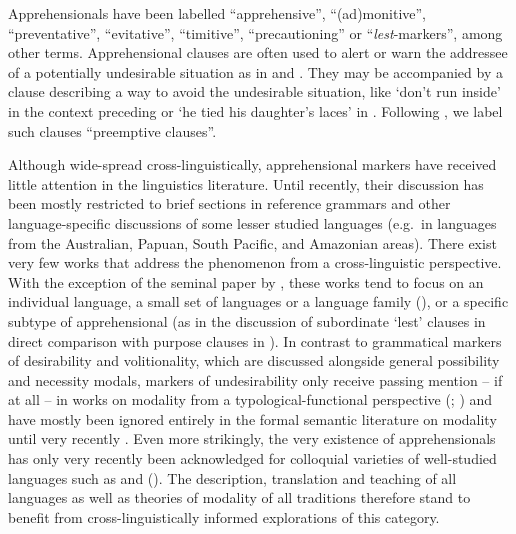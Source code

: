\documentclass[output=paper,colorlinks,citecolor=brown]{langscibook}
\begin{document}
Apprehensionals have been labelled ``apprehensive'', ``(ad)monitive'', ``preventative'', ``evitative'', ``timitive'', ``precautioning'' or ``\textit{lest}-markers'', among other terms. Apprehensional clauses are often used to alert or warn the addressee of a potentially undesirable situation as in  and . They may be accompanied by a clause describing a way to avoid the undesirable situation, like `don't run inside' in the context preceding  or `he tied his daughter's laces' in . Following \citet[265]{evans1995}, we label such clauses ``preemptive clauses''.
 
Although wide-spread cross-linguistically, apprehensional markers have received little attention in the linguistics literature. Until recently, their discussion has been mostly restricted to brief sections in reference grammars and other language-specific discussions of some lesser studied languages (e.g.\ in languages from the Australian, Papuan, South Pacific, and Amazonian areas). There exist very few works that address the phenomenon from a cross-linguistic perspective. With the exception of the seminal paper by \citet{Dobrushina2006}, these works tend to focus on an individual language, a small set of languages or a language family (\cite{lichtenberk1995,pakendorfschalley2007,vuillermet2018a}), or a specific subtype of apprehensional (as in the discussion of subordinate `lest' clauses in direct comparison with purpose clauses in \cite[129--144]{schmidtkebode2009}). In contrast to grammatical markers of desirability and volitionality, which are discussed alongside general possibility and necessity modals, markers of undesirability only receive passing mention -- if at all -- in works on modality from a typological-functional perspective (\cite[211]{bybeeetal1994}; \cite[22]{palmer2001}) and have mostly been ignored entirely in the formal semantic literature on modality until very recently \citep{anderbois2020salt,phillips2021,tahar2021, dabkowskianderbois2023}. Even more strikingly, the very existence of apprehensionals has only very recently been acknowledged for colloquial varieties of well-studied languages such as  \citep{boogaart2009,boogaart2020} and  (\cite{angeloschultzeberndt2018,fallerschultzeberndt2018,fenkoczlon2018}). The description, translation and teaching of all languages as well as theories of modality of all traditions therefore stand to benefit from cross-linguistically informed explorations of this category.
\end{document}
